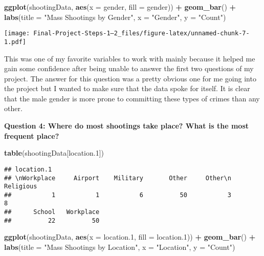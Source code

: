 \documentclass[
]{article}
\newenvironment{Shaded}{\begin{snugshade}}{\end{snugshade}}
\newcommand{\AttributeTok}[1]{\textcolor[rgb]{0.13,0.29,0.53}{#1}}
\newcommand{\FloatTok}[1]{\textcolor[rgb]{0.00,0.00,0.81}{#1}}
\newcommand{\FunctionTok}[1]{\textcolor[rgb]{0.13,0.29,0.53}{\textbf{#1}}}
\newcommand{\NormalTok}[1]{#1}
\newcommand{\SpecialCharTok}[1]{\textcolor[rgb]{0.81,0.36,0.00}{\textbf{#1}}}
\newcommand{\StringTok}[1]{\textcolor[rgb]{0.31,0.60,0.02}{#1}}
\begin{document}
\begin{Shaded}
\begin{Highlighting}[]
\FunctionTok{ggplot}\NormalTok{(shootingData, }\FunctionTok{aes}\NormalTok{(}\AttributeTok{x =}\NormalTok{ gender, }\AttributeTok{fill =}\NormalTok{ gender)) }\SpecialCharTok{+} \FunctionTok{geom\_bar}\NormalTok{() }\SpecialCharTok{+} 
  \FunctionTok{labs}\NormalTok{(}\AttributeTok{title =} \StringTok{"Mass Shootings by Gender"}\NormalTok{, }
       \AttributeTok{x =} \StringTok{"Gender"}\NormalTok{, }\AttributeTok{y =} \StringTok{"Count"}\NormalTok{)}
\end{Highlighting}
\end{Shaded}

\texttt{[image: Final-Project-Steps-1---2\_files/figure-latex/unnamed-chunk-7-1.pdf]}

This was one of my favorite variables to work with mainly because it
helped me gain some confidence after being unable to answer the first
two questions of my project. The answer for this question was a pretty
obvious one for me going into the project but I wanted to make sure that
the data spoke for itself. It is clear that the male gender is more
prone to committing these types of crimes than any other.

\textbf{Question 4: Where do most shootings take place? What is the most
frequent place?}

\begin{Shaded}
\begin{Highlighting}[]
\FunctionTok{table}\NormalTok{(shootingData[}\StringTok{\textquotesingle{}location.1\textquotesingle{}}\NormalTok{])}
\end{Highlighting}
\end{Shaded}

\begin{verbatim}
## location.1
## \nWorkplace     Airport    Military       Other     Other\n   Religious 
##           1           1           6          50           3           8 
##      School   Workplace 
##          22          50
\end{verbatim}

\begin{Shaded}
\begin{Highlighting}[]
\FunctionTok{ggplot}\NormalTok{(shootingData, }\FunctionTok{aes}\NormalTok{(}\AttributeTok{x =}\NormalTok{ location}\FloatTok{.1}\NormalTok{, }\AttributeTok{fill =}\NormalTok{ location}\FloatTok{.1}\NormalTok{)) }\SpecialCharTok{+} \FunctionTok{geom\_bar}\NormalTok{() }\SpecialCharTok{+} 
  \FunctionTok{labs}\NormalTok{(}\AttributeTok{title =} \StringTok{"Mass Shootings by Location"}\NormalTok{, }\AttributeTok{x =} \StringTok{"Location"}\NormalTok{, }\AttributeTok{y =} \StringTok{"Count"}\NormalTok{)}
\end{Highlighting}
\end{Shaded}
\end{document}
